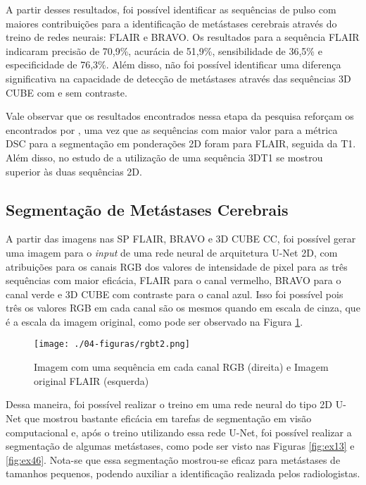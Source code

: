 A partir desses resultados, foi possível identificar as sequências de pulso com maiores contribuições para a identificação de metástases cerebrais através do treino de redes neurais: FLAIR e BRAVO. Os resultados para a sequência FLAIR indicaram precisão de 70,9\%, acurácia de 51,9\%, sensibilidade de 36,5\% e especificidade de 76,3\%. Além disso, não foi possível identificar uma diferença significativa na capacidade de detecção de metástases através das sequências 3D CUBE com e sem contraste.

Vale observar que os resultados encontrados nessa etapa da pesquisa reforçam os encontrados por \cite{Charron:2018}, uma vez que as sequências com maior valor para a métrica DSC para a segmentação em ponderações 2D foram para FLAIR, seguida da T1. Além disso, no estudo de \cite{Charron:2018} a utilização de uma sequência 3DT1 se mostrou superior às duas sequências 2D.

\subsection{Segmentação de Metástases Cerebrais}

A partir das imagens nas SP FLAIR, BRAVO e 3D CUBE CC, foi possível gerar uma imagem para o \textit{input} de uma rede neural de arquitetura U-Net 2D, com atribuições para os canais RGB dos valores de intensidade de pixel para as três sequências com maior eficácia, FLAIR para o canal vermelho,  BRAVO para o canal verde e 3D CUBE com contraste para o canal azul. Isso foi possível pois três os valores RGB em cada canal são os mesmos quando em escala de cinza, que é a escala da imagem original, como pode ser observado na Figura \ref{fig:rgbt2}.

\begin{figure}[!htb]
\centering
\texttt{[image: ./04-figuras/rgbt2.png]}
	\caption{Imagem com uma sequência em cada canal RGB (direita) e Imagem original FLAIR (esquerda)}\vspace{-0.2cm}
    \label{fig:rgbt2}
\end{figure}

Dessa maneira, foi possível realizar o treino em uma rede neural do tipo 2D U-Net \cite{Ronneberger:2015} que mostrou bastante eficácia em tarefas de segmentação em visão computacional e, após o treino utilizando essa rede U-Net, foi possível realizar a segmentação de algumas metástases, como pode ser visto nas Figuras \ref{fig:ex13} e \ref{fig:ex46}. Nota-se que essa segmentação mostrou-se eficaz para metástases de tamanhos pequenos, podendo auxiliar a identificação realizada pelos radiologistas.

